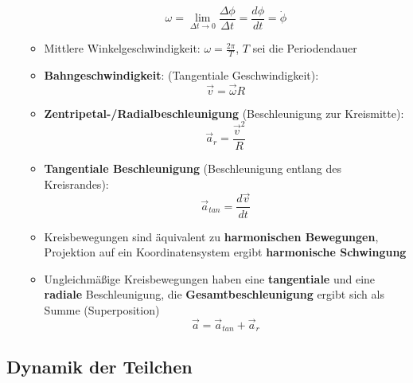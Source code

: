 \begin{itemize}
\begin{itemize}
		\begin{equation}
			\omega = \lim\limits_{\Delta t \rightarrow 0} \frac{\Delta \phi}{\Delta t} = \frac{d\phi}{dt} = \dot{\phi}
		\end{equation}
		\item Mittlere Winkelgeschwindigkeit: $\omega = \frac{2\pi}{T}$, $T$ sei die Periodendauer
		\item \textbf{Bahngeschwindigkeit}: (Tangentiale Geschwindigkeit):
		\begin{equation}
			\vec{v} = \vec{\omega} R
		\end{equation}
		\item \textbf{Zentripetal-/Radialbeschleunigung} (Beschleunigung zur Kreismitte):
		\begin{equation}
			\vec{a}_r = \frac{\vec{v}^2}{R}
		\end{equation}
		\item \textbf{Tangentiale Beschleunigung} (Beschleunigung entlang des Kreisrandes):
		\begin{equation}
			\vec{a}_{tan} = \frac{d\vec{v}}{dt}
		\end{equation}
		\item Kreisbewegungen sind äquivalent zu \textbf{harmonischen Bewegungen}, Projektion auf ein Koordinatensystem ergibt \textbf{harmonische Schwingung}
		\item Ungleichmäßige Kreisbewegungen haben eine \textbf{tangentiale} und eine \textbf{radiale} Beschleunigung, die \textbf{Gesamtbeschleunigung} ergibt sich als Summe (Superposition)
		\begin{equation}
			\vec{a} = \vec{a}_{tan} + \vec{a}_r
		\end{equation}
	\end{itemize}
\end{itemize}

\subsection{Dynamik der Teilchen}%
\label{mech:sub:dynamik_der_teilchen}

